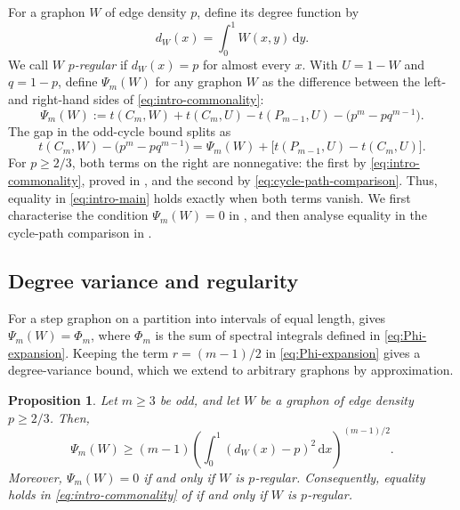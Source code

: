 \documentclass[11pt]{article}
\newtheorem{proposition}[theorem]{Proposition}
\theoremstyle{remark}
\numberwithin{equation}{section}
\newcommand{\dd}{\,\mathrm d}
\newcommand{\tC}[2]{t(C_{#1},#2)}
\newcommand{\tP}[2]{t(P_{#1},#2)}
\newcommand{\dW}{d_W}
\begin{document}
For a graphon $W$ of edge density $p$, define its degree function by
\[
  \dW(x)=\int_0^1 W(x,y)\dd y.
\]
We call $W$ \emph{$p$-regular} if $\dW(x)=p$ for almost every $x$.
With $U=1-W$ and $q=1-p$, define $\Psi_m(W)$ for any graphon $W$
as the difference between the left- and right-hand sides of
\eqref{eq:intro-commonality}:
\begin{equation}\label{eq:equality-gap}
  \Psi_m(W):=\tC mW+\tC mU-\tP{m-1}U-\bigl(p^m-pq^{m-1}\bigr).
\end{equation}
The gap in the odd-cycle bound splits as
\begin{equation}\label{eq:one-colour-gap}
  \tC mW-\bigl(p^m-pq^{m-1}\bigr)
  =\Psi_m(W)+\bigl[\tP{m-1}U-\tC mU\bigr].
\end{equation}
For $p\ge2/3$, both terms on the right are nonnegative: the first by
\eqref{eq:intro-commonality}, proved in ,
and the second by \eqref{eq:cycle-path-comparison}.
Thus, equality in \eqref{eq:intro-main} holds exactly when both terms vanish.
We first characterise the condition $\Psi_m(W)=0$ in
, and then analyse equality in the cycle-path
comparison in .

\subsection{Degree variance and regularity}
\label{subsec:degree-variance}

For a step graphon on a partition into intervals of equal length,
 gives
$\Psi_m(W)=\Phi_m$, where $\Phi_m$ is the sum of spectral integrals defined 
in \eqref{eq:Phi-expansion}.
Keeping the term $r=(m-1)/2$ in \eqref{eq:Phi-expansion} gives a degree-variance bound, which we extend to arbitrary graphons by approximation.

\begin{proposition}
\label{prop:regularity-gap}
  Let $m\ge3$ be odd, and let $W$ be a graphon of edge density $p\ge2/3$.
  Then,
  \begin{equation}\label{eq:degree-variance-gap}
    \Psi_m(W)\ge(m-1)
    \left(\int_0^1(\dW(x)-p)^2\dd x\right)^{(m-1)/2}.
  \end{equation}
  Moreover, $\Psi_m(W)=0$ if and only if $W$ is $p$-regular.
  Consequently, equality holds in \eqref{eq:intro-commonality} of
   if and only if $W$ is $p$-regular.
\end{proposition}
\end{document}
